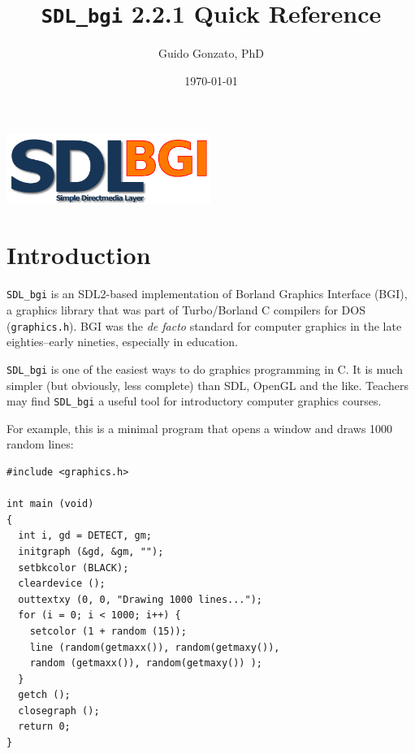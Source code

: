 \documentclass[a4paper,11pt]{article}
\newcommand{\SDLbgi}{\texttt{SDL\_bgi}}
\newcommand{\version}{2.2.1}        %
\begin{document}
\title{\SDLbgi{} \version{} Quick Reference}

\author{Guido Gonzato, PhD}

\date{\today}

\maketitle

\begin{center}
  \includegraphics[width=0.5\textwidth]{SDL_bgi_logo.png}  
\end{center}


\section{Introduction}

\SDLbgi{} is an SDL2-based implementation of Borland Graphics
Interface (BGI), a graphics library that was part of Turbo/Borland C
compilers for DOS (\texttt{graphics.h}). BGI was the \emph{de facto}
standard for computer graphics in the late eighties--early nineties,
especially in education.

\SDLbgi{} is one of the easiest ways to do graphics programming in C.
It is much simpler (but obviously, less complete) than SDL, OpenGL and
the like. Teachers may find \SDLbgi{} a useful tool for introductory
computer graphics courses.

For example, this is a minimal program that opens a window and draws
1000 random lines:

\begin{small}
\begin{verbatim}
#include <graphics.h>

int main (void)
{
  int i, gd = DETECT, gm;
  initgraph (&gd, &gm, "");
  setbkcolor (BLACK);
  cleardevice ();
  outtextxy (0, 0, "Drawing 1000 lines...");
  for (i = 0; i < 1000; i++) {
    setcolor (1 + random (15));
    line (random(getmaxx()), random(getmaxy()),
    random (getmaxx()), random(getmaxy()) );
  }
  getch ();
  closegraph ();
  return 0;
}
\end{verbatim}
\end{small}
\end{document}
